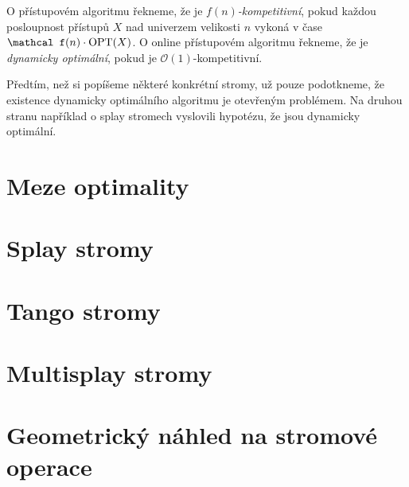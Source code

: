\begin{definice}
O přístupovém algoritmu řekneme, že je \emph{$f(n)$-kompetitivní}, pokud každou
posloupnost přístupů $X$ nad univerzem velikosti $n$ vykoná v čase $\mathcal
f(n)\cdot\opt(X)$. O online přístupovém algoritmu řekneme, že je
\emph{dynamicky optimální}, pokud je $\mathcal O(1)$-kompetitivní.
\end{definice}

Předtím, než si popíšeme některé konkrétní stromy, už pouze podotkneme, že
existence dynamicky optimálního algoritmu je otevřeným problémem. Na druhou
stranu například o splay stromech vyslovili \citet{splay} hypotézu, že jsou
dynamicky optimální.


\section{Meze optimality}

\section{Splay stromy}

\section{Tango stromy}

\section{Multisplay stromy}

\section{Geometrický náhled na stromové operace}
